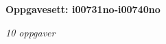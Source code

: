 \centerline{\bf Oppgavesett: i00731no-i00740no}
\vskip 10pt
\centerline{\it 10 oppgaver}\vskip 10pt
\vskip 10pt
